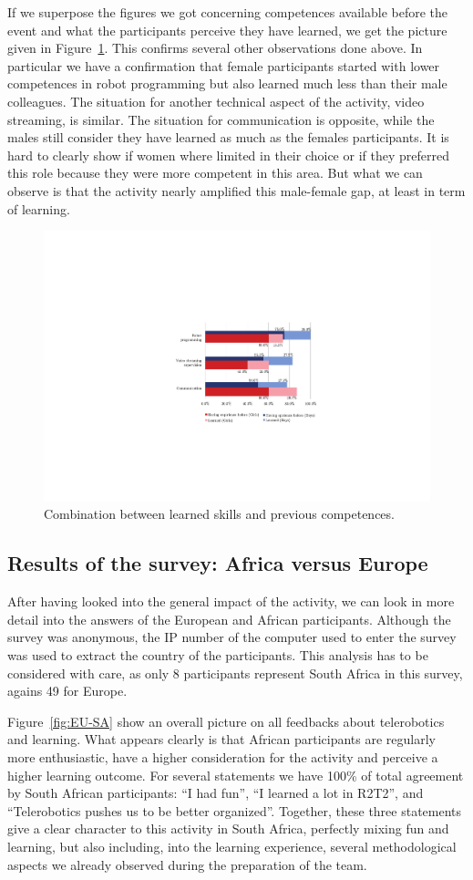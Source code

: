 \documentclass{intech-journal}
\begin{document}
If we superpose the figures we got concerning competences available before the event and what the participants perceive they have learned, we get the picture given in Figure~\ref{fig:learned}.
This confirms several other observations done above.
In particular we have a confirmation that female participants started with lower competences in robot programming but also learned much less than their male colleagues. 
The situation for another technical aspect of the activity, video streaming, is similar. 
The situation for communication is opposite, while the males still consider they have learned as much as the females participants. 
It is hard to clearly show if women where limited in their choice or if they preferred this role because they were more competent in this area. 
But what we can observe is that the activity nearly amplified this male-female gap, at least in term of learning. 


\begin{figure}[ht]
 \centering
    \includegraphics[width=0.6\columnwidth]{figures/learned.pdf}
  \caption{Combination between learned skills and previous competences.}
  \label{fig:learned} 
\end{figure}

\subsection{Results of the survey: Africa versus Europe}

After having looked into the general impact of the activity, we can look in more detail into the answers of the European and African participants. 
Although the survey was anonymous, the IP number of the computer used to enter the survey was used to extract the country of the participants.
This analysis has to be considered with care, as only 8 participants represent South Africa in this survey, agains 49 for Europe.


Figure~\ref{fig:EU-SA} show an overall picture on all feedbacks about telerobotics and learning.
What appears clearly is that African participants are regularly more enthusiastic, have a higher consideration for the activity and perceive a higher learning outcome. 
For several statements we have 100\% of total agreement by South African participants: ``I had fun'', ``I learned a lot in R2T2'', and ``Telerobotics pushes us to be better organized''.
Together, these three statements give a clear character to this activity in South Africa, perfectly mixing fun and learning, but also including, into the learning experience, several methodological aspects we already observed during the preparation of the team. 
\end{document}
